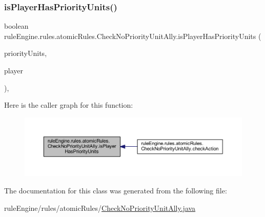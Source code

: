 \subsubsection{\texorpdfstring{is\+Player\+Has\+Priority\+Units()}{isPlayerHasPriorityUnits()}}
{\footnotesize\ttfamily boolean rule\+Engine.\+rules.\+atomic\+Rules.\+Check\+No\+Priority\+Unit\+Ally.\+is\+Player\+Has\+Priority\+Units (\begin{DoxyParamCaption}\item[{List$<$ \mbox{\hyperlink{classgame_1_1board_1_1_unit}{Unit}} $>$}]{priority\+Units,  }\item[{\mbox{\hyperlink{enumgame_1_1_e_player}{E\+Player}}}]{player }\end{DoxyParamCaption})\hspace{0.3cm}{\ttfamily [inline]}, {\ttfamily [private]}}

Here is the caller graph for this function\+:
\nopagebreak
\begin{figure}[H]
\begin{center}
\leavevmode
\includegraphics[width=350pt]{classrule_engine_1_1rules_1_1atomic_rules_1_1_check_no_priority_unit_ally_a45452c6d7649a9fdeef92f68eec43726_icgraph}
\end{center}
\end{figure}


The documentation for this class was generated from the following file\+:\begin{DoxyCompactItemize}
\item 
rule\+Engine/rules/atomic\+Rules/\mbox{\hyperlink{_check_no_priority_unit_ally_8java}{Check\+No\+Priority\+Unit\+Ally.\+java}}\end{DoxyCompactItemize}
